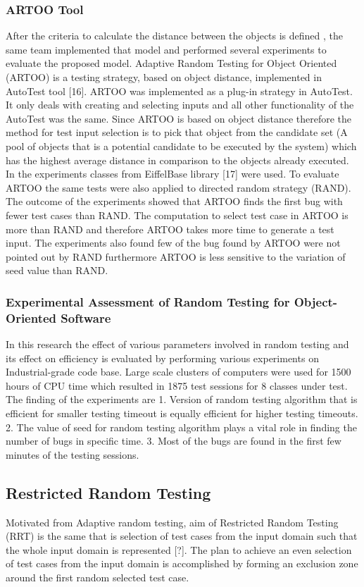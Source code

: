 \subsubsection{ARTOO Tool}
After the criteria to calculate the distance between the objects is defined \cite{Ciupa2006}, the same team implemented that model and performed several experiments to evaluate the proposed model. Adaptive Random Testing for Object Oriented (ARTOO) is a testing strategy, based on object distance, implemented in AutoTest tool [16].
ARTOO was implemented as a plug-in strategy in AutoTest. It only deals with creating and selecting inputs and all other functionality of the AutoTest was the same. Since ARTOO is based on object distance therefore the method for test input selection is to pick that object from the candidate set (A pool of objects that is a potential candidate to be executed by the system) which has the highest average distance in comparison to the objects already executed.
In the experiments classes from EiffelBase library [17] were used. To evaluate ARTOO the same tests were also applied to directed random strategy (RAND). The outcome of the experiments showed that ARTOO finds the first bug with fewer test cases than RAND. The computation to select test case in ARTOO is more than RAND and therefore ARTOO takes more time to generate a test input. The experiments also found few of the bug found by ARTOO were not pointed out by RAND furthermore ARTOO is less sensitive to the variation of seed value than RAND.

\subsubsection{Experimental Assessment of Random Testing for Object-Oriented Software}
In this research the effect of various parameters involved in random testing and its effect on efficiency is evaluated by performing various experiments on Industrial-grade code base.
Large scale clusters of computers were used for 1500 hours of CPU time which resulted in 1875 test sessions for 8 classes under test. \cite{Ciupa2007} The finding of the experiments are
1. Version of random testing algorithm that is efficient for smaller testing timeout is equally efficient for higher testing timeouts.
2. The value of seed for random testing algorithm plays a vital role in finding the number of bugs in specific time.
3. Most of the bugs are found in the first few minutes of the testing sessions.


\subsection{Restricted Random Testing}
Motivated from Adaptive random testing, aim of Restricted Random Testing (RRT) is the same that is selection of test cases from the input domain such that the whole input domain is represented [?]. The plan to achieve an even selection of test cases from the input domain is accomplished by forming an exclusion zone around the first random selected test case.

